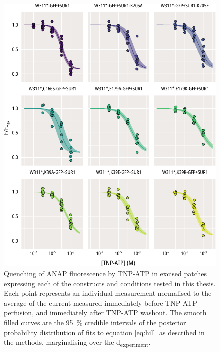 \begin{figure}[h]
	\centering
	\includegraphics[width=\textwidth]{all_pcf_fits_3.pdf}
	\caption[Excised patch quenching population hill fits]{
	Quenching of ANAP fluorescence by TNP-ATP in excised patches expressing each of the constructs and conditions tested in this thesis.
	Each point represents an individual measurement normalised to the average of the current measured immediately before TNP-ATP perfusion, and immediately after TNP-ATP washout.
	The smooth filled curves are the \SI{95}{\percent} credible intervals of the posterior probability distribution of fits to equation \ref{eq:hill} as described in the methods, marginalising over the \textgreek{d}\textsubscript{experiment}.
	}
	\label{apxfig:pcf_1}
\end{figure}

